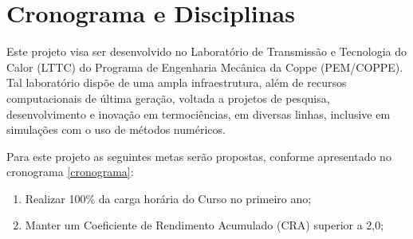 \section{Cronograma e Disciplinas}

Este projeto visa ser desenvolvido no Laboratório de Transmissão e Tecnologia do Calor (LTTC) do Programa de Engenharia Mecânica da Coppe (PEM/COPPE). 
Tal laboratório dispõe de uma ampla infraestrutura, 
além de recursos computacionais de última geração, 
voltada a projetos de pesquisa, desenvolvimento e inovação
em termociências, em diversas linhas, 
inclusive em simulações com o uso de métodos numéricos. 

\medskip
Para este projeto as seguintes metas serão propostas, conforme apresentado no cronograma \ref{cronograma}:

\begin{enumerate}

\item Realizar 100\% da carga horária do Curso no primeiro ano;

\item Manter um Coeficiente de Rendimento Acumulado (CRA) superior a 2,0;

\end{enumerate}
